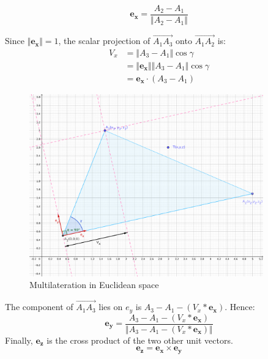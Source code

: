 \documentclass[\main/thesis.tex]{subfiles}
\begin{document}
\begin{equation}
    \boldsymbol{e_x} = \frac{A_2-A_1}{\Vert A_2 - A_1\Vert}
    \label{eqn:multilateration_ex}
\end{equation}

Since $\Vert \boldsymbol{e_x} \Vert = 1$, the scalar projection of $\overrightarrow{A_1A_3}$ onto $\overrightarrow{A_1A_2}$ is:
\begin{equation}
    \begin{split}
    V_x &= \Vert A_3 - A_1 \Vert \cos{\gamma} \\
    &= \Vert \boldsymbol{e_x} \Vert \Vert A_3 - A_1 \Vert \cos{\gamma}\\
    &= \boldsymbol{e_x} \cdot (A_3 - A_1)      
    \end{split}
\end{equation}

\begin{figure}[H]
    \centering
    \includegraphics[width=0.9\textwidth]{multilateration.png}
    \caption{Multilateration in Euclidean space}
    \label{fig:multilateration}
\end{figure}

The component of $\overrightarrow{A_1A_3}$ lies on $e_y$ is $A_3-A_1-(V_x*\boldsymbol{e_x})$. Hence:
\begin{equation}
    \boldsymbol{e_y} = \frac{A_3-A_1-(V_x*\boldsymbol{e_x})}{\Vert A_3-A_1-(V_x*\boldsymbol{e_x})\Vert}
\end{equation}
Finally, $\boldsymbol{e_z}$ is the cross product of the two other unit vectors.
\begin{equation}
    \boldsymbol{e_z} = \boldsymbol{e_x} \times \boldsymbol{e_y}
\end{equation}
\end{document}
